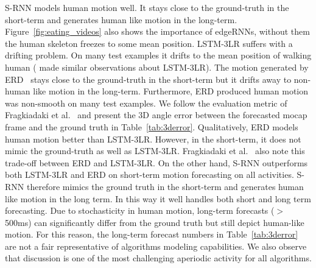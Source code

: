 \documentclass[10pt,twocolumn,letterpaper]{article}
\begin{document}
\iffalse
S-RNN models human motion well. It stays close to the ground-truth in the short-term and generates human like motion in the long-term. Figure~\ref{fig:eating_videos}  also shows the importance of edgeRNNs, without them the human skeleton freezes to some mean position. LSTM-3LR suffers with a drifting problem. On many test examples it drifts to the mean position of walking human (\cite{Fragkiadaki15} made similar observations about LSTM-3LR). The motion generated by ERD~\cite{Fragkiadaki15} stays close to the ground-truth in the short-term but it drifts away to non-human like motion in the long-term. Furthermore, ERD produced  human motion was non-smooth on many test examples. 
We follow the evaluation metric of Fragkiadaki et al.~\cite{Fragkiadaki15} and present the 3D angle error between the forecasted mocap frame and the ground truth in Table~\ref{tab:3derror}.  Qualitatively, ERD models human motion better than LSTM-3LR. However, in the short-term, it does not mimic the ground-truth as well as LSTM-3LR. Fragkiadaki et al.~\cite{Fragkiadaki15} also note this trade-off between ERD and LSTM-3LR. On the other hand, S-RNN outperforms both LSTM-3LR and ERD on short-term motion forecasting on all activities. S-RNN therefore mimics  the ground truth in the short-term and generates human like motion in the long term. In this way it well handles both short and long term forecasting. Due to stochasticity in human motion, long-term forecasts ($>$ 500ms) can significantly differ from the ground truth but still depict human-like motion. For this reason, the long-term forecast numbers in Table~\ref{tab:3derror} are not a fair representative of algorithms modeling capabilities. We also observe that discussion is one of the most challenging aperiodic activity for all algorithms. 
\end{document}
